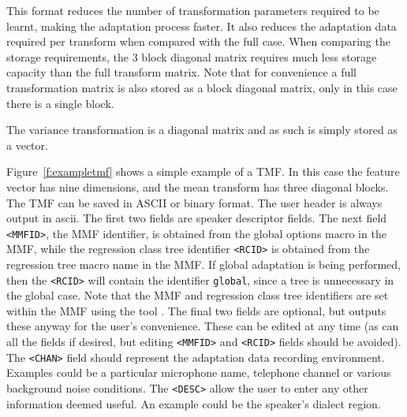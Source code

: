 This format reduces the number of transformation parameters required
to be learnt, making the adaptation process faster. It also reduces
the adaptation data required per transform when compared with the full
case. When comparing the storage requirements, the 3 block diagonal
matrix requires much less storage capacity than the full transform matrix.
Note that for convenience a full transformation matrix is also stored 
as a block diagonal matrix, only in this case there is a single block.

The variance transformation is a diagonal matrix and as such is simply
stored as a vector.

\noindent
Figure~\ref{f:exampletmf} shows a simple example of a TMF. In this
case the feature vector has nine dimensions, and the mean transform has
three diagonal blocks. 
The TMF can be saved in ASCII or binary format. The user header is
always output in ascii.
The first two fields are speaker descriptor fields. The next field
\texttt{<MMFID>}, the MMF identifier, is obtained from the global
options macro in the MMF, while the regression class tree identifier
\texttt{<RCID>} is obtained from the regression tree macro name in the
MMF.
If global adaptation is being performed, then the \texttt{<RCID>} will
contain the identifier \texttt{global}, since a tree is unnecessary in
the global case.
Note that the MMF and regression class tree identifiers are set within the
MMF using the tool . 
The final two fields are optional, but  outputs these
anyway for the user's convenience. These can be edited at any time (as
can all the fields if desired, but editing \texttt{<MMFID>} and
\texttt{<RCID>} fields should be avoided). The \texttt{<CHAN>} field
should represent the adaptation data recording environment. Examples
could be a particular microphone name, telephone channel or various
background noise conditions. The \texttt{<DESC>} allow the user to
enter any other information deemed useful. An example could be the
speaker's dialect region.


